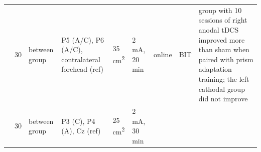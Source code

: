 \documentclass[11pt,english,]{memoir}
\begin{document}
\begin{longtable}[]{@{}lllllllll@{}}
\begin{minipage}[t]{0.09\columnwidth}
\end{minipage} & \begin{minipage}[t]{0.02\columnwidth}\raggedright
30\strut
\end{minipage} & \begin{minipage}[t]{0.04\columnwidth}\raggedright
between
group\strut
\end{minipage} & \begin{minipage}[t]{0.10\columnwidth}\raggedright
P5 (A/C), P6 (A/C),
contralateral
forehead (ref)\strut
\end{minipage} & \begin{minipage}[t]{0.04\columnwidth}\raggedright
35
cm\textsuperscript{2}\strut
\end{minipage} & \begin{minipage}[t]{0.04\columnwidth}\raggedright
2 mA,
20 min\strut
\end{minipage} & \begin{minipage}[t]{0.04\columnwidth}\raggedright
online\strut
\end{minipage} & \begin{minipage}[t]{0.10\columnwidth}\raggedright
BIT\strut
\end{minipage} & \begin{minipage}[t]{0.28\columnwidth}\raggedright
group with 10 sessions of right anodal tDCS improved more
than sham when paired with prism adaptation training; the
left cathodal group did not improve\strut
\end{minipage}\tabularnewline
\begin{minipage}[t]{0.09\columnwidth}\raggedright
\textcite{Yi2016}\strut
\end{minipage} & \begin{minipage}[t]{0.02\columnwidth}\raggedright
30\strut
\end{minipage} & \begin{minipage}[t]{0.04\columnwidth}\raggedright
between
group\strut
\end{minipage} & \begin{minipage}[t]{0.10\columnwidth}\raggedright
P3 (C), P4 (A), Cz
(ref)\strut
\end{minipage} & \begin{minipage}[t]{0.04\columnwidth}\raggedright
25
cm\textsuperscript{2}\strut
\end{minipage} & \begin{minipage}[t]{0.04\columnwidth}\raggedright
2 mA,
30 min\strut
\end{minipage} & \begin{minipage}[t]{0.04\columnwidth}\raggedright

\end{minipage}
\end{longtable}
\end{document}
